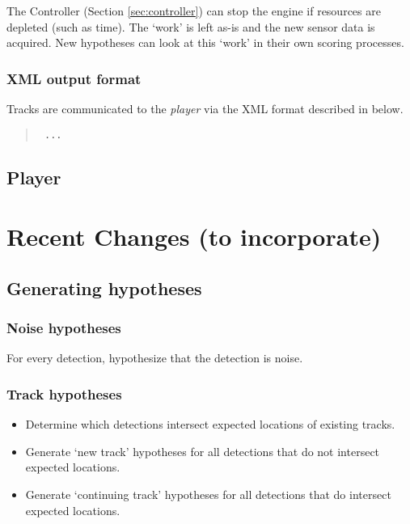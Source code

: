 \documentclass{book}
\begin{document}
The Controller (Section \ref{sec:controller}) can stop the engine if resources
are depleted (such as time). The `work' is left as-is and the new sensor data is
acquired. New hypotheses can look at this `work' in their own scoring processes.

\subsection{XML output format}

Tracks are communicated to the \emph{player} via the XML format described in
below.

\begin{quote}
{\tt
...
}
\end{quote}

\section{Player}
\label{sec:player}


\chapter{Recent Changes (to incorporate)}

\section{Generating hypotheses}

\subsection{Noise hypotheses}

For every detection, hypothesize that the detection is noise.

\subsection{Track hypotheses}

\begin{itemize}

\item Determine which detections intersect expected locations of
  existing tracks.

\item Generate `new track' hypotheses for all detections that do not
  intersect expected locations.

\item Generate `continuing track' hypotheses for all detections that
  do intersect expected locations.

\end{itemize}
\end{document}
